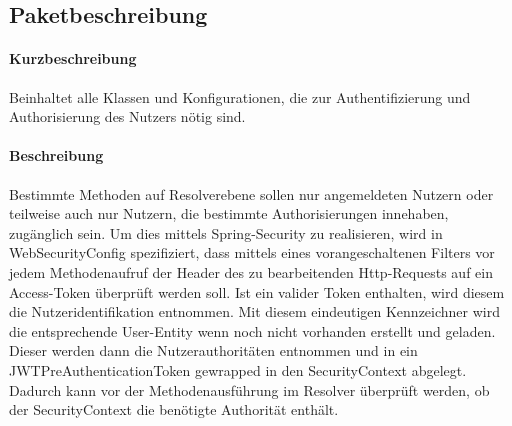 \subsection*{Paketbeschreibung}%
\paragraph*{Kurzbeschreibung}
Beinhaltet alle Klassen und Konfigurationen, die zur Authentifizierung und Authorisierung des Nutzers nötig sind.
\paragraph*{Beschreibung}
Bestimmte Methoden auf Resolverebene sollen nur angemeldeten Nutzern oder teilweise auch nur Nutzern, die bestimmte Authorisierungen
innehaben, zugänglich sein. Um dies mittels Spring-Security zu realisieren, wird in \dq WebSecurityConfig\dq{} spezifiziert, dass mittels eines vorangeschaltenen Filters vor jedem
Methodenaufruf der Header des zu bearbeitenden Http-Requests auf ein Access-Token überprüft werden soll. Ist ein valider Token enthalten, 
wird diesem die Nutzeridentifikation entnommen. Mit diesem eindeutigen Kennzeichner wird die entsprechende User-Entity
wenn noch nicht vorhanden erstellt und geladen. Dieser werden dann  die Nutzerauthoritäten entnommen und in ein JWTPreAuthenticationToken gewrapped in den SecurityContext abgelegt. Dadurch kann vor der Methodenausführung
im Resolver überprüft werden, ob der SecurityContext die benötigte Authorität enthält.

